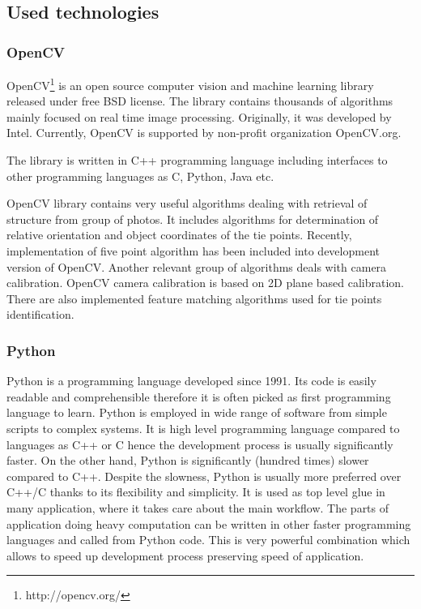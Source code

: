 \documentclass[a4paper,12pt]{article}
\begin{document}
\subsection{Used technologies}

\subsubsection{OpenCV}


OpenCV\footnote{http://opencv.org/} is an open source computer vision and machine learning library released under free BSD license.
The library contains thousands of algorithms mainly focused on real time image processing.
Originally, it was developed by Intel. Currently, OpenCV is supported by non-profit organization OpenCV.org.

The library is written in C++ programming language including interfaces to other programming languages as C, Python, Java etc. 

OpenCV library contains very useful algorithms dealing with retrieval of structure from group 
of photos. It includes algorithms for determination of relative orientation 
and object coordinates of the tie points.
Recently, implementation of five point algorithm has been included into development version of OpenCV.
Another relevant group of algorithms deals with camera calibration. OpenCV  camera calibration
is based on 2D plane based calibration.  
There are also implemented feature matching algorithms used for tie points identification. 

\subsubsection{Python}

Python is a programming language developed since 1991. 
Its code is easily readable and comprehensible therefore it is often picked as first programming
language to learn. Python is employed in wide range of software from simple scripts to complex systems.
It is high level programming language compared to languages as C++ or C hence 
the development process is usually significantly faster. On the other hand,
Python is significantly (hundred times) slower compared to C++. Despite the slowness, 
 Python is usually more preferred over C++/C thanks to its flexibility and simplicity.
It is used as top level glue in many application, where it takes care about 
the main workflow. The parts of application doing heavy computation can 
be written in other faster programming languages and called 
from Python code. This is very powerful combination which allows to speed up development 
process preserving speed of application.
\end{document}
